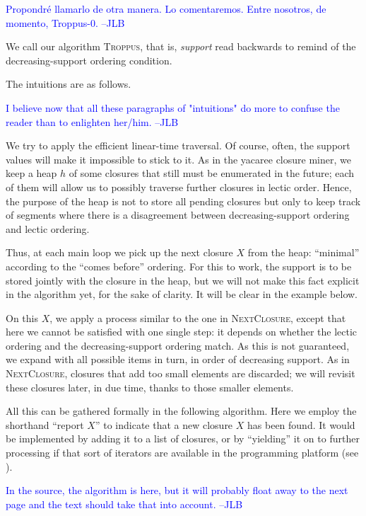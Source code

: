 \documentclass{article}
\newcommand{\added}[1]{\textcolor{blue}{#1}}
\begin{document}
\added{Propondré llamarlo de otra manera. Lo comentaremos.
Entre nosotros, de momento, Troppus-0. --JLB}

We call our algorithm \textsc{Troppus}, 
that is, \textsl{support} read backwards to remind of the
decreasing-support ordering condition.

The intuitions are as follows. 

\added{I believe now that all these paragraphs of "intuitions" 
do more to confuse the reader than to enlighten her/him. --JLB}

We try to apply
the efficient linear-time traversal. Of course, often, the
support values will make it impossible to stick to it.
As in the yacaree closure miner, we keep 
a heap $h$ of some closures that still must be
enumerated in the future; 
each of them will allow us to possibly traverse 
further closures in  lectic order. Hence, the purpose of the
heap is not to store all pending closures
but only to keep track of segments where
there is a disagreement between decreasing-support
ordering and lectic ordering.

Thus, at each main loop we pick up the next closure $X$
from the heap: ``minimal'' according to 
the ``comes before'' ordering. 
For this to work, the support is to be stored jointly with the
closure in the heap, but we will not make this fact
explicit in the algorithm yet, for the sake of clarity.
It will be clear in the example below.

On this $X$, we apply a process similar to the one in \textsc{NextClosure},
except that here we cannot be satisfied with one single step:
it depends on whether the lectic ordering and
the decreasing-support ordering match. As this is not 
guaranteed, we expand with all possible items in turn,
in order of decreasing support.
As in \textsc{NextClosure}, closures that add too 
small elements are discarded; we will revisit these 
closures later, in due time, thanks to those smaller 
elements.

All this can be gathered formally in the following algorithm. Here we
employ the shorthand ``report $X$'' to indicate that a new closure $X$
has been found. It would be implemented by adding it to a list of 
closures, or by ``yielding'' it on to further processing if that sort
of iterators are available in the programming platform 
(see \cite{BaGaDe12}). %

\added{In the source, the algorithm is here, but it will
probably float away to the next page and the text should
take that into account. --JLB}
\end{document}
